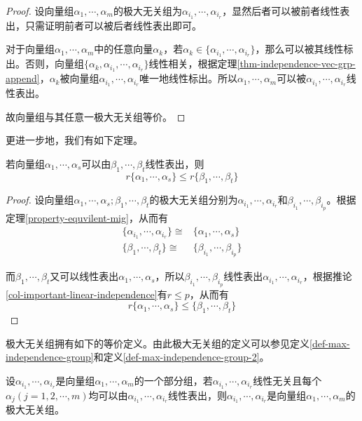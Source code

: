 \begin{proof}
    设向量组$\alpha_1,\cdots,\alpha_m$的极大无关组为$\alpha_{i_1},\cdots,\alpha_{i_r}$，显然后者可以被前者线性表出，只需证明前者可以被后者线性表出即可。

    对于向量组$\alpha_1,\cdots,\alpha_m$中的任意向量$\alpha_k$，若$\alpha_k\in\{\alpha_{i_1},\cdots,\alpha_{i_r}\}$，那么可以被其线性标出。否则，向量组$\{\alpha_k,\alpha_{i_1},\cdots,\alpha_{i_r}\}$线性相关，根据定理\ref{thm-independence-vec-grp-append}，$\alpha_k$被向量组$\alpha_{i_1},\cdots,\alpha_{i_r}$唯一地线性标出。所以$\alpha_1,\cdots,\alpha_m$可以被$\alpha_{i_1},\cdots,\alpha_{i_r}$线性表出。

    故向量组与其任意一极大无关组等价。
\end{proof}

更进一步地，我们有如下定理。

\begin{thm}
    \label{thm-rank-decrease-by-linear-composition}
    若向量组$\alpha_1,\cdots,\alpha_s$可以由$\beta_1,\cdots,\beta_t$线性表出，则
    \[
        r\{\alpha_1,\cdots,\alpha_s\}\leqslant r\{\beta_1,\cdots,\beta_t\}
    \]
\end{thm}

\begin{proof}
    设向量组$\alpha_1,\cdots,\alpha_s;\beta_1,\cdots,\beta_t$的极大无关组分别为$\alpha_{i_1},\cdots,\alpha_{i_r}$和$\beta_{i_1},\cdots,\beta_{i_p}$。根据定理\ref{property-equvilent-mig}，从而有
    \[
        \begin{aligned}
            \{\alpha_{i_1},\cdots,\alpha_{i_r}\}\cong&\{\alpha_1,\cdots,\alpha_s\} \\
            \{\beta_1,\cdots,\beta_t\}\cong&\{\beta_{i_1},\cdots,\beta_{i_p}\}
        \end{aligned}
    \]

    而$\beta_1,\cdots,\beta_t$又可以线性表出$\alpha_1,\cdots,\alpha_s$，所以$\beta_{i_1},\cdots,\beta_{i_p}$线性表出$\alpha_{i_1},\cdots,\alpha_{i_r}$，根据推论\ref{col-important-linear-independence}有$r\leqslant p$，从而有
    \[
        r\{\alpha_1,\cdots,\alpha_s\}\leqslant\{\beta_1,\cdots,\beta_t\}
    \]
\end{proof}

极大无关组拥有如下的等价定义。由此极大无关组的定义可以参见定义\ref{def-max-independence-group}和定义\ref{def-max-independence-group-2}。

\begin{definition}
    \label{def-max-independence-group-2}
    设$\alpha_{i_1},\cdots,\alpha_{i_r}$是向量组$\alpha_1,\cdots,\alpha_m$的一个部分组，若$\alpha_{i_1},\cdots,\alpha_{i_r}$线性无关且每个$\alpha_j(j=1,2,\cdots,m)$均可以由$\alpha_{i_1},\cdots,\alpha_{i_r}$线性表出，则$\alpha_{i_1},\cdots,\alpha_{i_r}$是向量组$\alpha_1,\cdots,\alpha_m$的极大无关组。
\end{definition}

